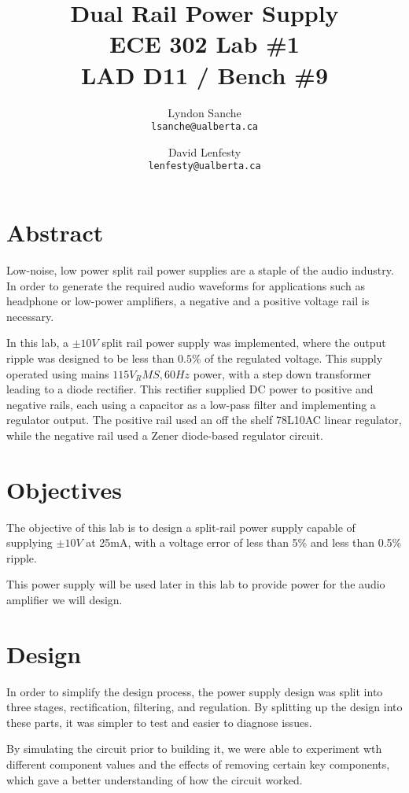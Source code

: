 \documentclass[12pt]{article}
\title{ {\Huge Dual Rail Power Supply } \\
    ECE 302 Lab \#1 \\ LAD D11 / Bench \#9}
\author{
    Lyndon Sanche\\
    \texttt{lsanche@ualberta.ca}
    \and
    David Lenfesty\\
    \texttt{lenfesty@ualberta.ca}
}
\begin{document}

\maketitle


\section{Abstract}

Low-noise, low power split rail power supplies are a staple of the audio industry.
In order to generate the required audio waveforms for applications such as headphone or
low-power amplifiers, a negative and a positive voltage rail is necessary.

In this lab, a $\pm 10 V$ split rail power supply was implemented,
where the output ripple was designed to be less than $ 0.5 \% $ of the
regulated voltage. This supply operated using mains $115 V_RMS, 60Hz $ power, with
a step down transformer leading to a diode rectifier. This rectifier supplied DC power to
positive and negative rails, each using a capacitor as a low-pass filter and implementing
a regulator output. The positive rail used an off the shelf 78L10AC linear regulator,
while the negative rail used a Zener diode-based regulator circuit.

\newpage
{}

\section{Objectives}

The objective of this lab is to design a split-rail power supply capable of supplying
$\pm 10V$ at 25mA, with a voltage error of less than 5\% and less than 0.5\% ripple.

This power supply will be used later in this lab to provide power for the audio amplifier
we will design.

\section{Design}

In order to simplify the design process, the power supply design was split into three
stages, rectification, filtering, and regulation. By splitting up the design into these
parts, it was simpler to test and easier to diagnose issues.

By simulating the circuit prior to building it, we were able to experiment wth different
component values and the effects of removing certain key components, which gave a better
understanding of how the circuit worked.
\end{document}
